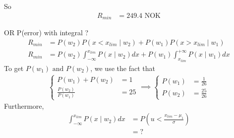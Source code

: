 \documentclass[a4paper, 10pt, twoside]{article}
\begin{document}
\begin{enumerate}[a)]
          So
          \begin{align*}
              R_{min} & = 249.4 \text{ NOK}
          \end{align*}

          OR P(error) with integral ?
          \begin{align*}
              R_{min} & = P(w_2)P(x < x_{lim} \mid w_2) + P(w_1)P(x > x_{lim} \mid w_1)                                       \\
              R_{min} & = P(w_2) \int_{-\infty}^{x_{lim}} P(x \mid w_2) dx + P(w_1) \int_{x_{lim}}^{+\infty} P(x \mid w_1) dx
          \end{align*}
          To get $P(w_1) \text{ and } P(w_2)$, we use the fact that
          \begin{align*}
              \begin{cases}
                  P(w_1)+P(w_2)         & = 1  \\
                  \frac{P(w_2)}{P(w_1)} & = 25
              \end{cases}
              \implies
              \begin{cases}
                  P(w_1) & = \frac{1}{26}  \\
                  P(w_2) & = \frac{25}{26}
              \end{cases}
          \end{align*}
          Furthermore,
          \begin{align*}
              \int_{-\infty}^{x_{lim}} P(x \mid w_2) dx & = P(u < \frac{x_{lim} - \mu_1}{\sigma}) \\
                                                        & = ?
          \end{align*}
\end{enumerate}
\end{document}
